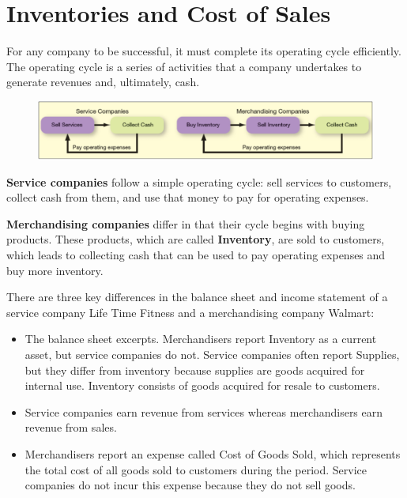 \documentclass[../main.tex]{subfiles}
\begin{document}
	\section{Inventories and Cost of Sales}
	
	For any company to be successful, it must complete its operating cycle 
	efficiently. The operating cycle is a series of activities that a company 
	undertakes to generate revenues and, ultimately, cash. 
	
	\begin{figure}[ht]
		\centering
		\includegraphics[width=1\columnwidth]{images/c7/operating_cycles.png}
	\end{figure}
	
	\textbf{Service companies} follow a simple operating 
	cycle: sell services to customers, collect cash from them, and use that 
	money to pay for operating expenses.
	
	\textbf{Merchandising companies} differ in that their cycle begins with 
	buying products. These products, which are called \textbf{Inventory}, are 
	sold to customers, which leads to collecting cash that can be used to pay 
	operating expenses and buy more inventory.  
	
	
	There are three key differences in the balance sheet and income statement 
	of a service company \eg Life Time Fitness and a merchandising company 
	\eg Walmart:
	\begin{itemize}[noitemsep]
		\item The balance sheet excerpts. Merchandisers report Inventory as a 
		current asset, but service companies do not. Service companies often 
		report Supplies, but they differ from inventory because supplies are 
		goods acquired for internal use. Inventory consists of goods acquired 
		for resale to customers.
		\item Service companies earn revenue from services whereas 
		merchandisers earn revenue from sales.
		\item Merchandisers report an expense called Cost of Goods Sold, which 
		represents the total cost of all goods sold to customers during the 
		period. Service companies do not incur this expense because they do not 
		sell goods.
	\end{itemize}
	
\end{document}
